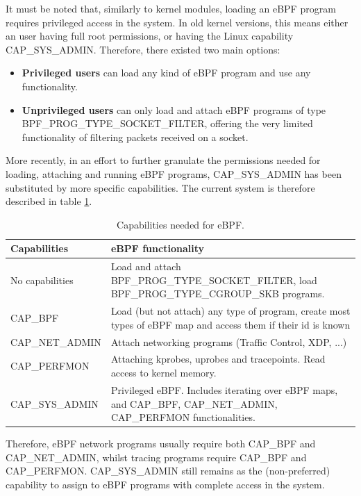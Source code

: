 \documentclass[12pt]{report} %
\begin{document}
It must be noted that, similarly to kernel modules, loading an eBPF program requires privileged access in the system. In old kernel versions, this means either an user having full root permissions, or having the Linux capability\cite{ubuntu_caps} CAP\_SYS\_ADMIN. Therefore, there existed two main options:
\begin{itemize}
\item \textbf{Privileged users} can load any kind of eBPF program and use any functionality.
\item \textbf{Unprivileged users} can only load and attach eBPF programs of type BPF\_PROG\_TYPE\_SOCKET\_FILTER\cite{evil_ebpf_p9}, offering the very limited functionality of filtering packets received on a socket.
\end{itemize}

More recently, in an effort to further granulate the permissions needed for loading, attaching and running eBPF programs, CAP\_SYS\_ADMIN has been substituted by more specific capabilities\cite{ebpf_caps_intro}\cite{ebpf_caps_lwn}. The current system is therefore described in table \ref{table:ebpf_caps_current}.

\begin{table}[H]
\begin{tabular}{|>{\centering\arraybackslash}p{4cm}|>{\centering\arraybackslash}p{10cm}|}
\hline
Capabilities & eBPF functionality\\
\hline
\hline
No capabilities & Load and attach BPF\_PROG\_TYPE\_SOCKET\_FILTER, load BPF\_PROG\_TYPE\_CGROUP\_SKB programs.\\
\hline
CAP\_BPF & Load (but not attach) any type of program, create most types of eBPF map and access them if their id is known\\
\hline
CAP\_NET\_ADMIN & Attach networking programs (Traffic Control, XDP, ...)\\
\hline
CAP\_PERFMON & Attaching kprobes, uprobes and tracepoints. Read access to kernel memory.\\
\hline
CAP\_SYS\_ADMIN & Privileged eBPF. Includes iterating over eBPF maps, and CAP\_BPF, CAP\_NET\_ADMIN, CAP\_PERFMON functionalities.\\
\hline
\end{tabular}
\caption{Capabilities needed for eBPF.}
\label{table:ebpf_caps_current}
\end{table}

Therefore, eBPF network programs usually require both CAP\_BPF and CAP\_NET\_ADMIN, whilst tracing programs require CAP\_BPF and CAP\_PERFMON. CAP\_SYS\_ADMIN still remains as the (non-preferred) capability to assign to eBPF programs with complete access in the system.
\end{document}
